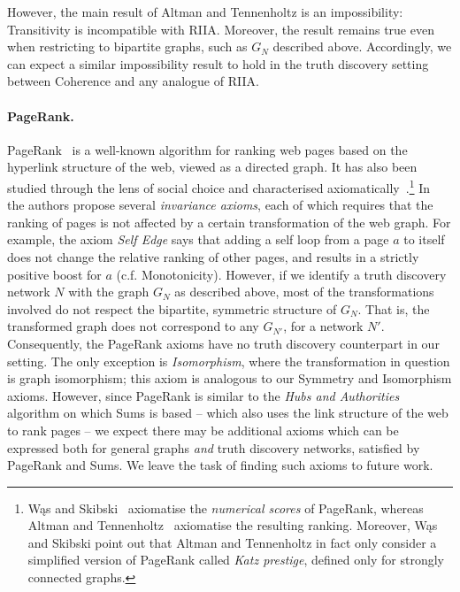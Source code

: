 However, the main result of Altman and Tennenholtz is an impossibility:
Transitivity is incompatible with RIIA. Moreover, the result remains true even
when restricting to bipartite graphs, such as $G_N$ described above.
Accordingly, we can expect a similar impossibility result to hold in the truth
discovery setting between Coherence and any analogue of RIIA.

\paragraph{PageRank.} PageRank~\cite{page_pagerank_1999} is a well-known
algorithm for ranking web pages based on the hyperlink structure of the web,
viewed as a directed graph. It has also been studied through the lens of social
choice and characterised
axiomatically~\cite{altman2005ranking,skibski_pagerank}.\footnote{
    Wąs and Skibski~\cite{skibski_pagerank} axiomatise the \emph{numerical
    scores} of PageRank, whereas Altman and
    Tennenholtz~\cite{altman2005ranking} axiomatise the resulting ranking.
    Moreover, Wąs and Skibski point out that Altman and Tennenholtz in fact
    only consider a simplified version of PageRank called \emph{Katz prestige},
    defined only for strongly connected graphs.
} In ~\cite{altman2005ranking} the authors propose several \emph{invariance
axioms}, each of which requires that the ranking of pages is not affected by a
certain transformation of the web graph. For example, the axiom \emph{Self
Edge} says that adding a self loop from a page $a$ to itself does not change the relative
ranking of other pages, and results in a strictly positive boost for $a$ (c.f.
Monotonicity). However, if we identify a truth discovery network $N$ with the
graph $G_N$ as described above, most of the transformations involved do not
respect the bipartite, symmetric structure of $G_N$. That is, the transformed
graph does not correspond to any $G_{N'}$, for a network $N'$. Consequently,
the PageRank axioms have no truth discovery counterpart in our
setting. The only exception is \emph{Isomorphism}, where the transformation
in question is graph isomorphism; this axiom is analogous to our Symmetry and
Isomorphism axioms. However, since PageRank is similar to the \emph{Hubs and
Authorities}~\cite{kleinberg1999} algorithm on which Sums is based -- which
also uses the link structure of the web to rank pages -- we expect there may be
additional axioms which can be expressed both for general graphs \emph{and}
truth discovery networks, satisfied by PageRank and Sums. We leave the task of
finding such axioms to future work.

